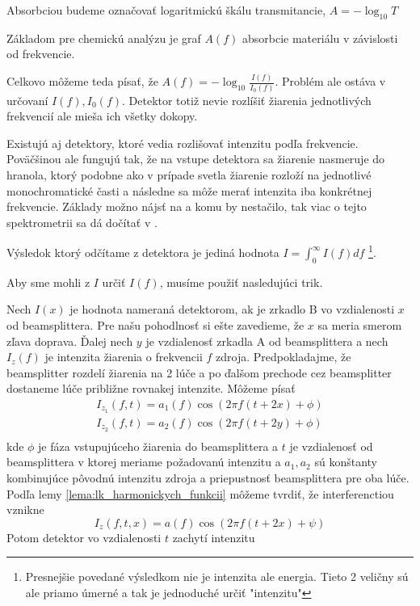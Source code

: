 \begin{definicia}[Absorbcia]
    Absorbciou budeme označovať logaritmickú škálu transmitancie,
    $A=-\log_{10}T$
\end{definicia}

Základom pre chemickú analýzu je graf $A(f)$ absorbcie materiálu v
závislosti od frekvencie. 

Celkovo môžeme teda písať, že $A(f) = -\log_{10} \frac{I(f)}{I_0(f)}$.
Problém ale ostáva v určovaní $I(f), I_0(f)$. Detektor totiž nevie rozlíšiť
žiarenia jednotlivých frekvencií ale mieša ich všetky dokopy.

\begin{poznamka}
    Existujú aj detektory, ktoré vedia rozlišovať intenzitu podľa
    frekvencie. Poväčšinou ale fungujú tak, že na vstupe detektora sa
    žiarenie nasmeruje do hranola, ktorý podobne ako v prípade svetla
    žiarenie rozloží na jednotlivé monochromatické časti a následne
    sa môže merať intenzita iba konkrétnej frekvencie. Základy možno
    nájsť na \cite{wiki:spectrometer} a komu by nestačilo, tak viac o tejto
    spektrometrii sa dá dočítať v \todo{}. 
\end{poznamka}



Výsledok ktorý odčítame z detektora je jediná hodnota 
$I=\int_0^\infty I(f) df$
\footnote{Presnejšie povedané výsledkom nie je intenzita ale energia.
Tieto 2 veličny sú ale priamo úmerné a tak je jednoduché určiť
"intenzitu"}.

Aby sme mohli z $I$ určiť $I(f)$, musíme použiť nasledujúci trik.

Nech $I(x)$ je hodnota nameraná detektorom, ak je zrkadlo B vo
vzdialenosti $x$ od beamsplittera. Pre našu pohodlnosť si ešte zavedieme,
že $x$ sa meria smerom zľava doprava. Ďalej nech $y$ je vzdialenosť zrkadla
A od beamsplittera a nech $I_z(f)$ je intenzita žiarenia o frekvencii
$f$ zdroja. Predpokladajme, že beamsplitter rozdelí žiarenia na 2 lúče
a po ďalšom prechode cez beamsplitter dostaneme lúče 
približne rovnakej intenzite. Môžeme písať
\begin{align}
    I_{z_1}(f,t) = a_1(f) \cos (2 \pi f (t+2x) + \phi) \\
    I_{z_2}(f,t) = a_2(f) \cos (2 \pi f (t+2y) + \phi) \\
\end{align}
kde $\phi$ je fáza vstupujúceho žiarenia do beamsplittera a $t$ je
vzdialenosť od beamsplittera v ktorej meriame požadovanú intenzitu a
$a_1,a_2$ sú konštanty kombinujúce pôvodnú intenzitu zdroja a
priepustnosť beamsplittera pre oba lúče.
Podľa lemy \ref{lema:lk_harmonickych_funkcii} môžeme tvrdiť, že
interferenctiou vznikne
\begin{equation}
    I_{z}(f,t,x) = a(f) \cos (2 \pi f (t+2x) + \psi)
\end{equation}
Potom detektor vo vzdialenosti $t$ zachytí intenzitu

